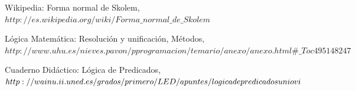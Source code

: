 \documentclass{article}
\begin{document}
\begin{thebibliography}{9}

Wikipedia: Forma normal de Skolem,
\\\texttt{$http://es.wikipedia.org/wiki/Forma\_normal\_de\_Skolem$}

L\'ogica Matem\'atica: Resoluci\'on y unificaci\'on, M\'etodos,
\\\texttt{$http://www.uhu.es/nieves.pavon/pprogramacion/temario/anexo/anexo.html\#\_Toc495148247$}

Cuaderno Did\'actico: L\'ogica de Predicados,
\\\texttt{$http://wainu.ii.uned.es/grados/primero/LED/apuntes/logica\-de\-predicados\-uniovi$}
\end{thebibliography}
\end{document}
